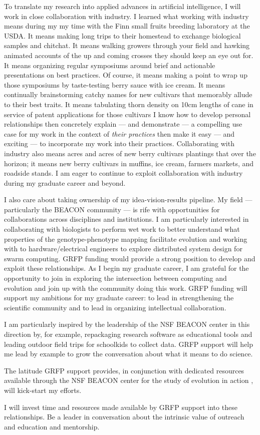 To translate my research into applied advances in artificial intelligence, I will work in close collaboration with industry.
I learned what working with industry means during my my time with the Finn small fruits breeding laboratory at the USDA.
It means making long trips to their homestead to exchange biological samples and chitchat.
It means walking growers through your field and hawking animated accounts of the up and coming crosses they should keep an eye out for.
It means organizing regular symposiums around brief and actionable presentations on best practices.
Of course, it means making a point to wrap up those symposiums by taste-testing berry sauce with ice cream.
It means continually brainstorming catchy names for new cultivars that memorably allude to their best traits.
It means tabulating thorn density on 10cm lengths of cane in service of patent applications for those cultivars
I know how to develop personal relationships then concretely explain --- and demonstrate --- a compelling use case for my work in the context of \textit{their practices} then make it easy --- and exciting --- to incorporate my work into their practices.
Collaborating with industry also means acres and acres of new berry cultivars plantings that over the horizon; it means new berry cultivars in muffins, ice cream, farmers markets, and roadside stands.
I am eager to continue to exploit collaboration with industry during my graduate career and beyond.


I also care about taking ownership of my idea-vision-results pipeline.
My field --- particularly the BEACON community --- is rife with opportunities for collaborations across disciplines and institutions.
I am particularly interested in collaborating with biologists to perform wet work to better understand what properties of the genotype-phenotype mapping facilitate evolution and working with to hardware/electrical engineers to explore distributed system design for swarm computing.
GRFP funding would provide a strong position to develop and exploit these relationships.
As I begin my graduate career, I am grateful for the opportunity to join in exploring the intersection between computing and evolution and join up with the community doing this work.
GRFP funding will support my ambitions for my graduate career: to lead in strengthening the scientific community and to lead in organizing intellectual collaboration.

I am particularly inspired by the leadership of the NSF BEACON center in this direction by, for example, repackaging research software as educational tools and leading outdoor field trips for schoolkids to collect data.
GRFP support will help me lead by example to grow the conversation about what it means to do science.


The latitude GRFP support provides, in conjunction with dedicated resources available through the NSF BEACON center for the study of evolution in action , will kick-start my efforts.

I will invest time and resources made available by GRFP support into these relationships.
Be a leader in conversation about the intrinsic value of outreach and education and mentorship.
